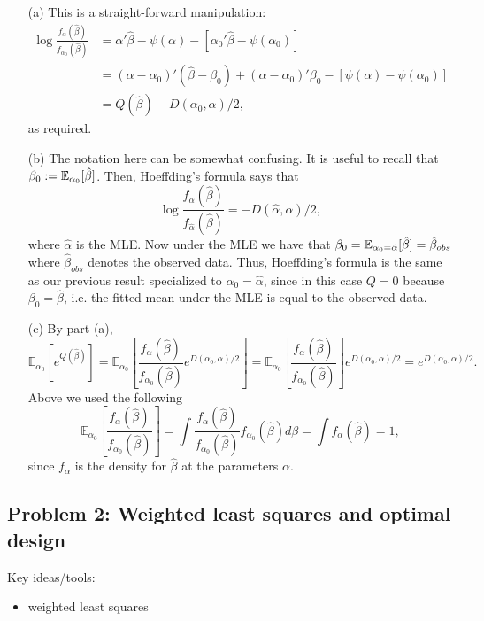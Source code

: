 \begin{enumerate}
\item[(a)] This is a straight-forward manipulation:
\begin{align*}
\log \frac{f_\alpha(\hat\beta)}{f_{\alpha_0}(\hat\beta)}
&= \alpha'\hat\beta - \psi(\alpha) - [\alpha_0'\hat\beta - \psi(\alpha_0)] \\
&= (\alpha-\alpha_0)'(\hat\beta-\beta_0) + (\alpha-\alpha_0)'\beta_0 - [\psi(\alpha)-\psi(\alpha_0)] \\ 
&= Q \left(\hat\beta \right) - D(\alpha_0, \alpha) / 2,
\end{align*}
as required.

\item[(b)] The notation here can be somewhat confusing. It is useful to recall that $\beta_0 := \mathbb{E}_{\alpha_0}[\hat{\beta}]$. Then, Hoeffding's formula says that
\begin{equation*}
\log \frac{f_\alpha(\hat\beta)}{f_{\hat\alpha}(\hat\beta)} = -D(\hat\alpha, \alpha)/2,
\end{equation*}
where $\hat{\alpha}$ is the MLE. Now under the MLE we have that $\beta_0 = \mathbb{E}_{\alpha_0 = \hat{\alpha}}[\hat{\beta}] = \hat{\beta}_{obs}$ where $\hat{\beta}_{obs}$ denotes the observed data. Thus, Hoeffding's formula is the same as our previous result specialized to $\alpha_0=\hat\alpha$, since in this case $Q = 0$ because $\beta_0=\hat\beta$, i.e. the fitted mean under the MLE is equal to the observed data. 

\item[(c)] By part (a), 
\begin{equation*}
\mathbb E_{\alpha_0} \left[ e^{Q(\hat\beta)}\right] = \mathbb{E}_{\alpha_0} \left[ \frac{f_{\alpha}(\hat\beta) }{f_{\alpha_0}(\hat\beta)} e^{D(\alpha_0,\alpha)/2} \right] = \mathbb E_{\alpha_0} \left[\frac{f_{\alpha}(\hat\beta) }{f_{\alpha_0}(\hat\beta)} \right] e^{D(\alpha_0,\alpha)/2} = e^{D(\alpha_0,\alpha)/2}.
\end{equation*}
Above we used the following 
\[\mathbb E_{\alpha_0} \left[\frac{f_{\alpha}(\hat\beta) }{f_{\alpha_0}(\hat\beta)} \right] = \int \frac{f_\alpha(\hat\beta)}{f_{\alpha_0}(\hat\beta)} f_{\alpha_0}(\hat\beta)d\beta = \int f_\alpha(\hat\beta) = 1, \]
since $f_\alpha$ is the density for $\hat\beta$ at the parameters $\alpha$. 


\end{enumerate}


\subsection*{Problem 2: Weighted least squares and optimal design}
Key ideas/tools:
\begin{itemize}
\item weighted least squares
\end{itemize}

